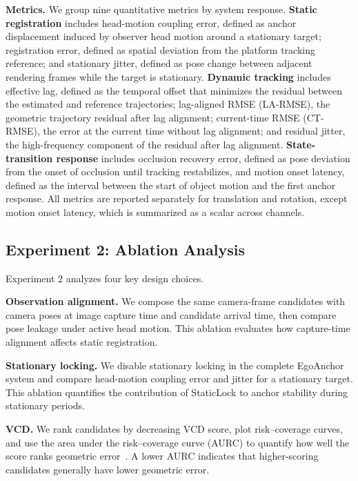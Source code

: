 \documentclass[review]{vgtc}
\begin{document}
\textbf{Metrics.}
We group nine quantitative metrics by system response. \textbf{Static registration} includes head-motion coupling error, defined as anchor displacement induced by observer head motion around a stationary target; registration error, defined as spatial deviation from the platform tracking reference; and stationary jitter, defined as pose change between adjacent rendering frames while the target is stationary. \textbf{Dynamic tracking} includes effective lag, defined as the temporal offset that minimizes the residual between the estimated and reference trajectories; lag-aligned RMSE (LA-RMSE), the geometric trajectory residual after lag alignment; current-time RMSE (CT-RMSE), the error at the current time without lag alignment; and residual jitter, the high-frequency component of the residual after lag alignment. \textbf{State-transition response} includes occlusion recovery error, defined as pose deviation from the onset of occlusion until tracking restabilizes, and motion onset latency, defined as the interval between the start of object motion and the first anchor response. All metrics are reported separately for translation and rotation, except motion onset latency, which is summarized as a scalar across channels.

\subsection{Experiment 2: Ablation Analysis}\label{sec:exp2-design}

Experiment 2 analyzes four key design choices.

\textbf{Observation alignment.}
We compose the same camera-frame candidates with camera poses at image capture time and candidate arrival time, then compare pose leakage under active head motion. This ablation evaluates how capture-time alignment affects static registration.

\textbf{Stationary locking.}
We disable stationary locking in the complete EgoAnchor system and compare head-motion coupling error and jitter for a stationary target. This ablation quantifies the contribution of StaticLock to anchor stability during stationary periods.

\textbf{VCD.}
We rank candidates by decreasing VCD score, plot risk--coverage curves, and use the area under the risk--coverage curve (AURC) to quantify how well the score ranks geometric error~\cite{riskcontrolled2020,ding2020uncertainty}. A lower AURC indicates that higher-scoring candidates generally have lower geometric error.
\end{document}
